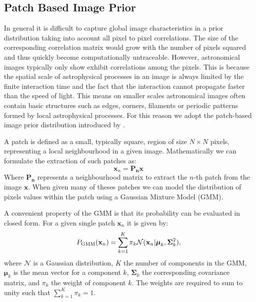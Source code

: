 \documentclass[twocolumn]{aastex631}
\begin{document}
    \subsection{Patch Based Image Prior}
    \label{sec:patch-prior}
    In general it is difficult to capture global image characteristics in a prior distribution taking into account all pixel to pixel correlations. The size of the corresponding correlation matrix would grow with the number of pixels squared and thus quickly become computationally untraceable. However, astronomical images typically only show exhibit correlations among the pixels. This is because the spatial scale of astrophysical processes in an image is always limited by the finite interaction time and the fact that the interaction cannot propagate faster than the speed of light. This means on smaller scales astronomical images often contain basic structures such as edges, corners, filaments or periodic patterns formed by local astrophysical processes. For this reason we adopt the patch-based image prior distribution introduced by \cite{Zoran2011}. 

    A patch is defined as a small, typically square, region of size $N \times N$ pixels, representing a local neighbourhood in a given image. Mathematically we can formulate the extraction of such patches as:
    \begin{equation}
        \mathbf{x}_n = \mathbf{P_n x}
    \end{equation}
    Where $\mathbf{P_n}$ represents a neighbourhood matrix to extract the $n$-th patch from the image $\mathbf{x}$. When given many of theses patches we can model the distribution of pixels values within the patch using a Gaussian Mixture Model (GMM). 
    
    A convenient property of the GMM is that its probability can be evaluated in closed form. For a given single patch $\mathbf{x}_n$ it is given by:
    \begin{equation}
        \label{eq:gmm}
        P_{\rm GMM}(\mathbf{x}_n) = \sum_{k=1}^K \pi_k \mathcal{N}(\mathbf{x}_n| \boldsymbol{\mu}_k, \boldsymbol{\Sigma}_k^2),
    \end{equation}
    where $\mathcal{N}$ is a Gaussian distribution, $K$ the number of components in the GMM, $\boldsymbol{\mu}_k$ is the mean vector for a component $k$, $\boldsymbol{\Sigma}_k$ the corresponding covariance matrix, and $\pi_k$ the weight of component $k$. The weights are required to sum to unity such that $\sum_{k=1}^K\pi_k = 1$. 
\end{document}
